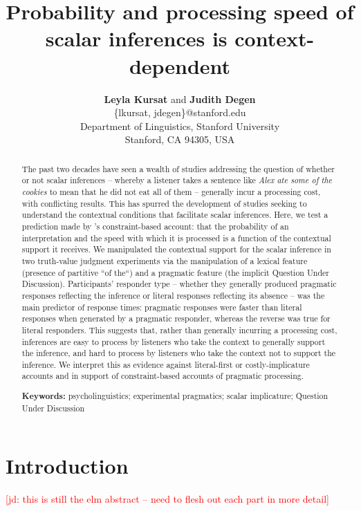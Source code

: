 \documentclass[10pt,letterpaper]{article}
\title{Probability and processing speed of scalar inferences is context-dependent}
\author{{\large \textbf{Leyla Kursat}  {\normalfont and} \textbf{Judith Degen}}  \\
 \{lkursat, jdegen\}@stanford.edu \\
  Department of Linguistics, Stanford University \\
  Stanford, CA 94305, USA}
\newcommand{\jd}[1]{\textcolor{Red}{[jd: #1]}}
\begin{document}
\maketitle


\begin{abstract}

The past two decades have seen a wealth of studies addressing the question of whether or not scalar inferences -- whereby a listener takes a sentence like \textit{Alex ate some of the cookies} to mean that he did not eat all of them -- generally incur a processing cost, with conflicting results. This has spurred the development of studies seeking to understand the contextual conditions that facilitate scalar inferences. Here, we test a prediction made by 's constraint-based account: that the probability of an interpretation and the speed with which it is processed is a function of the contextual support it receives. We manipulated the contextual support for the scalar inference in two truth-value judgment experiments  via the manipulation of a lexical feature (presence of partitive ``of the``) and a pragmatic feature (the implicit Question Under Discussion). Participants' responder type -- whether they generally produced pragmatic responses reflecting the inference or literal responses reflecting its absence -- was the main predictor of response times: pragmatic responses  were faster than literal responses when generated by a pragmatic responder, whereas the reverse was true for literal responders. This suggests that, rather than generally incurring a processing cost, inferences are easy to process by listeners who take the context to generally support the inference, and hard to process by listeners who take the context not to support the inference. We interpret this as evidence against literal-first or costly-implicature accounts and in support of constraint-based accounts of pragmatic processing.

\textbf{Keywords:} psycholinguistics; experimental pragmatics; scalar implicature; Question Under Discussion

\end{abstract}

\section{Introduction}

\jd{this is still the elm abstract -- need to flesh out each part in more detail}
\end{document}
